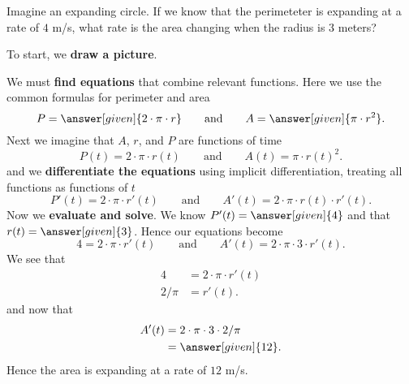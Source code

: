 \documentclass{ximera}
\begin{document}
\begin{example}
  Imagine an expanding circle. If we know that the perimeteter is
  expanding at a rate of $4$ m/s, what rate is the area changing
  when the radius is $3$ meters?
  \begin{explanation}
    To start, we \textbf{draw a picture}.
    \begin{image}
    \end{image}
    We must \textbf{find equations} that combine relevant
    functions. Here we use the common formulas for perimeter and area
    \[
    P = \answer[given]{2\cdot \pi \cdot r}
    \qquad\text{and}\qquad
    A = \answer[given]{\pi \cdot r^2}.
    \]
    Next we imagine that $A$, $r$, and $P$ are functions of time
    \[
    P(t) = 2\cdot \pi \cdot r(t)
    \qquad\text{and}\qquad
    A(t) = \pi \cdot r(t)^2.
    \]
    and we \textbf{differentiate the equations} using implicit
    differentiation, treating all functions as functions of $t$
    \[
    P'(t) = 2\cdot \pi\cdot r'(t)
    \qquad\text{and}\qquad
    A'(t) = 2\cdot \pi\cdot r(t) \cdot r'(t).
    \]
    Now we \textbf{evaluate and solve}. We know $P'(t) =
    \answer[given]{4}$ and that $r(t) = \answer[given]{3}$. Hence our
    equations become
    \[
    4 = 2\cdot \pi\cdot r'(t)
    \qquad\text{and}\qquad
    A'(t) = 2\cdot \pi\cdot 3 \cdot r'(t).
    \]
    We see that
    \begin{align*}
      4 &= 2\cdot \pi\cdot r'(t)\\
      2/\pi &= r'(t).
    \end{align*}
    and now that
    \begin{align*}
      A'(t) &= 2\cdot \pi\cdot 3 \cdot 2/\pi\\
      &=\answer[given]{12}.
    \end{align*}
    Hence the area is expanding at a rate of $12$ m/s.
  \end{explanation}
\end{example}


\end{document}
